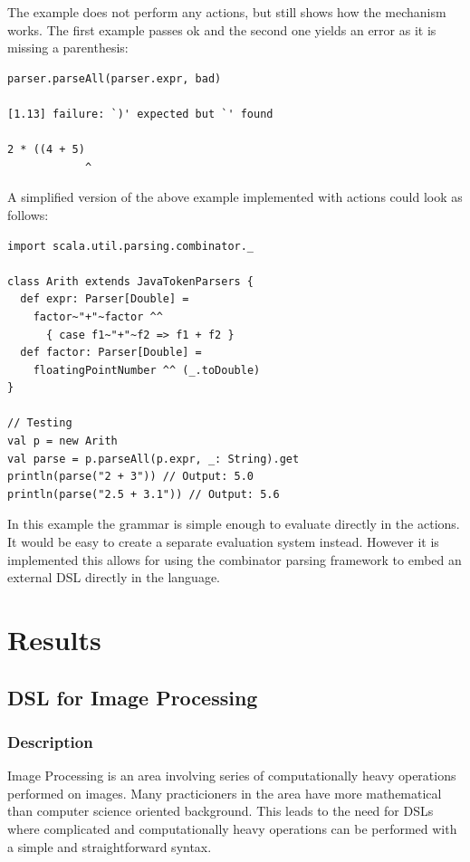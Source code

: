 \documentclass[a4paper,english]{report}
\begin{document}
The example does not perform any actions, but still shows how the
mechanism works. The first example passes ok and the second one yields
an error as it is missing a parenthesis:

\begin{lstlisting}[language=tex]
parser.parseAll(parser.expr, bad)

[1.13] failure: `)' expected but `' found

2 * ((4 + 5)
            ^
\end{lstlisting}

A simplified version of the above example implemented with actions
could look as follows:

\begin{lstlisting}
import scala.util.parsing.combinator._

class Arith extends JavaTokenParsers {
  def expr: Parser[Double] =
    factor~"+"~factor ^^ 
      { case f1~"+"~f2 => f1 + f2 }
  def factor: Parser[Double] =
    floatingPointNumber ^^ (_.toDouble)
}

// Testing
val p = new Arith
val parse = p.parseAll(p.expr, _: String).get
println(parse("2 + 3")) // Output: 5.0
println(parse("2.5 + 3.1")) // Output: 5.6
\end{lstlisting}

In this example the grammar is simple enough to evaluate directly in
the actions. It would be easy to create a separate evaluation system
instead. However it is implemented this allows for using the
combinator parsing framework to embed an external DSL directly in the
language.

\chapter{Results}

\section{DSL for Image Processing}

\subsection{Description}

Image Processing is an area involving series of computationally heavy
operations performed on images. Many practicioners in the area have
more mathematical than computer science oriented background. This
leads to the need for DSLs where complicated and computationally heavy
operations can be performed with a simple and straightforward syntax.
\end{document}
